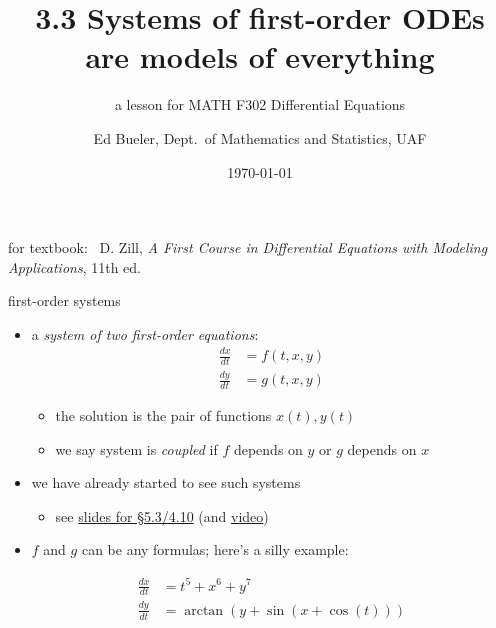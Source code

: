 \documentclass[urlcolor=blue,dvipsnames]{beamer}
\title{3.3 Systems of first-order ODEs \\ are models of everything}
\subtitle{a lesson for MATH F302 Differential Equations}
\author{Ed Bueler, Dept.~of Mathematics and Statistics, UAF}
\date{\tiny \today}
\begin{document}
\renewcommand{\thefootnote}{{\color{green} \arabic{footnote}}}

\begin{frame}
\titlepage

\centerline{\tiny for textbook: \, D. Zill, \emph{A First Course in Differential Equations with Modeling Applications}, 11th ed.}
\end{frame}

\newcommand{\LL}[1]{\mathcal{L}\left\{#1\right\}}
\newcommand{\LLi}[1]{\mathcal{L}^{-1}\left\{#1\right\}}


\begin{frame}{first-order systems}

\begin{itemize}
\item a \emph{system of two first-order equations}:
\begin{align*}
\frac{dx}{dt} &= f(t,x,y) \\
\frac{dy}{dt} &= g(t,x,y)
\end{align*}

\vspace{-2mm}
    \begin{itemize}
    \item the solution is the pair of functions $x(t),y(t)$
    \item we say system is \emph{coupled} if $f$ depends on $y$ or $g$ depends on $x$
    \end{itemize}
\item we have already started to see such systems
    \begin{itemize}
    \item see \href{https://bueler.github.io/math302/assets/slides/5-3.pdf}{slides for \S5.3/4.10} (and \href{https://expl.ai/VSJTFRC}{video})
    \end{itemize}
\item $f$ and $g$ can be any formulas; here's a silly example:

\vspace{-3mm}
\scriptsize
\begin{align*}
\frac{dx}{dt} &= t^5 + x^6 + y^7 \\
\frac{dy}{dt} &= \arctan(y + \sin(x + \cos(t)))
\end{align*}
\normalsize
\end{itemize}
\end{frame}
\end{document}
